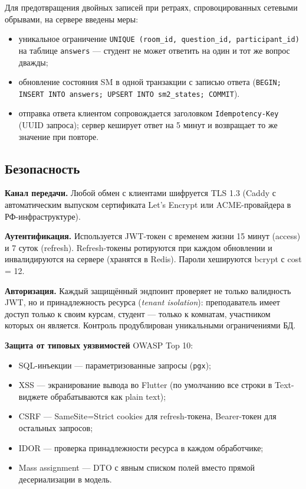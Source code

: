 Для предотвращения двойных записей при ретраях, спровоцированных
сетевыми обрывами, на сервере введены меры:
\begin{itemize}[noitemsep]
    \item уникальное ограничение
          \texttt{UNIQUE (room\_id, question\_id, participant\_id)}
          на таблице \texttt{answers} --- студент не может ответить
          на один и тот же вопрос дважды;
    \item обновление состояния SM в одной транзакции
          с записью ответа (\texttt{BEGIN; INSERT INTO answers; UPSERT
          INTO sm2\_states; COMMIT}).
    \item отправка ответа клиентом сопровождается заголовком
          \texttt{Idempotency-Key} (UUID запроса); сервер кеширует
          ответ на 5 минут и возвращает то же значение при повторе.
\end{itemize}

\subsection{Безопасность}

\textbf{Канал передачи.} Любой обмен с клиентами шифруется
TLS 1.3 (Caddy с автоматическим выпуском сертификата Let's Encrypt
или ACME-провайдера в РФ-инфраструктуре).

\textbf{Аутентификация.} Используется JWT-токен с временем жизни
15 минут (access) и 7 суток (refresh). Refresh-токены ротируются
при каждом обновлении и инвалидируются на сервере (хранятся в Redis).
Пароли хешируются bcrypt с cost = 12.

\textbf{Авторизация.} Каждый защищённый эндпоинт проверяет
не только валидность JWT, но и принадлежность ресурса
(\textit{tenant isolation}): преподаватель имеет доступ только
к своим курсам, студент --- только к комнатам, участником
которых он является. Контроль продублирован уникальными
ограничениями БД.

\textbf{Защита от типовых уязвимостей} OWASP Top 10:
\begin{itemize}[noitemsep]
    \item SQL-инъекции --- параметризованные запросы (\texttt{pgx});
    \item XSS --- экранирование вывода во Flutter
          (по умолчанию все строки в Text-виджете обрабатываются
          как plain text);
    \item CSRF --- SameSite=Strict cookies для refresh-токена,
          Bearer-токен для остальных запросов;
    \item IDOR --- проверка принадлежности ресурса в каждом обработчике;
    \item Mass assignment --- DTO с явным списком полей
          вместо прямой десериализации в модель.
\end{itemize}

